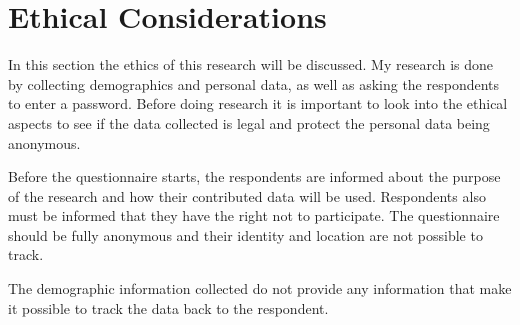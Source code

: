 \section{Ethical Considerations}
\label{sec:ethical}

	In this section the ethics of this research will be discussed. My research is done by collecting demographics and personal data, as well as asking the respondents to enter a password. Before doing research it is important to look into the ethical aspects to see if the data collected is legal and protect the personal data being anonymous. 

	Before the questionnaire starts, the respondents are informed about the purpose of the research and how their contributed data will be used. Respondents also must be informed that they have the right not to participate. The questionnaire should be fully anonymous and their identity and location are not possible to track. 

	The demographic information collected do not provide any information that make it possible to track the data back to the respondent. 